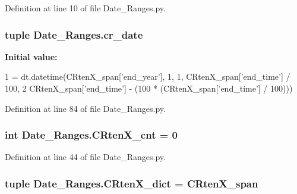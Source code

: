 Definition at line 10 of file Date\+\_\+\+Ranges.\+py.

\hypertarget{namespace_date___ranges_a0e1868e374f00a243815eb9757833c80}{}
\subsubsection[{cr\+\_\+date}]{\setlength{\rightskip}{0pt plus 5cm}tuple Date\+\_\+\+Ranges.\+cr\+\_\+date}\label{namespace_date___ranges_a0e1868e374f00a243815eb9757833c80}
{\bfseries Initial value\+:}
\begin{DoxyCode}
1 = dt.datetime(CRtenX\_span[\textcolor{stringliteral}{'end\_year'}], 1, 1, CRtenX\_span[\textcolor{stringliteral}{'end\_time'}] / 100,
2                               CRtenX\_span[\textcolor{stringliteral}{'end\_time'}] - (100 * (CRtenX\_span[\textcolor{stringliteral}{'end\_time'}] / 100)))
\end{DoxyCode}


Definition at line 84 of file Date\+\_\+\+Ranges.\+py.

\hypertarget{namespace_date___ranges_a343f0166e1218b0e3eeb2ab0f08cfea6}{}
\subsubsection[{C\+Rten\+X\+\_\+cnt}]{\setlength{\rightskip}{0pt plus 5cm}int Date\+\_\+\+Ranges.\+C\+Rten\+X\+\_\+cnt = 0}\label{namespace_date___ranges_a343f0166e1218b0e3eeb2ab0f08cfea6}


Definition at line 44 of file Date\+\_\+\+Ranges.\+py.

\hypertarget{namespace_date___ranges_a8d71b20b2d6f8a8bb8883a6f96a6cb7e}{}
\subsubsection[{C\+Rten\+X\+\_\+dict}]{\setlength{\rightskip}{0pt plus 5cm}tuple Date\+\_\+\+Ranges.\+C\+Rten\+X\+\_\+dict = {\bf C\+Rten\+X\+\_\+span}}\label{namespace_date___ranges_a8d71b20b2d6f8a8bb8883a6f96a6cb7e}


